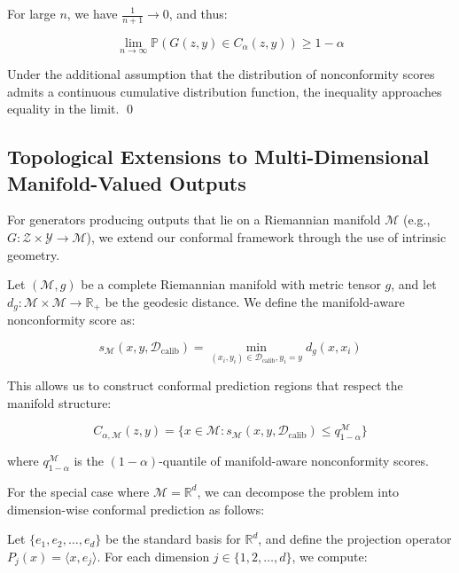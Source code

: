 \documentclass{article}
\theoremstyle{plain}
\theoremstyle{definition}
\theoremstyle{remark}
\begin{document}
For large $n$, we have $\frac{1}{n+1} \rightarrow 0$, and thus:

\begin{equation}
\lim_{n \rightarrow \infty} \mathbb{P}(G(z, y) \in C_{\alpha}(z, y)) \geq 1 - \alpha
\end{equation}

Under the additional assumption that the distribution of nonconformity scores admits a continuous cumulative distribution function, the inequality approaches equality in the limit. \qed

\subsection{Topological Extensions to Multi-Dimensional Manifold-Valued Outputs}

For generators producing outputs that lie on a Riemannian manifold $\mathcal{M}$ (e.g., $G: \mathcal{Z} \times \mathcal{Y} \rightarrow \mathcal{M}$), we extend our conformal framework through the use of intrinsic geometry.

Let $(\mathcal{M}, g)$ be a complete Riemannian manifold with metric tensor $g$, and let $d_g: \mathcal{M} \times \mathcal{M} \rightarrow \mathbb{R}_+$ be the geodesic distance. We define the manifold-aware nonconformity score as:

\begin{equation}
s_{\mathcal{M}}(x, y, \mathcal{D}_{\text{calib}}) = \min_{(x_i, y_i) \in \mathcal{D}_{\text{calib}}, y_i = y} d_g(x, x_i)
\end{equation}

This allows us to construct conformal prediction regions that respect the manifold structure:

\begin{equation}
C_{\alpha, \mathcal{M}}(z, y) = \{x \in \mathcal{M}: s_{\mathcal{M}}(x, y, \mathcal{D}_{\text{calib}}) \leq q_{1-\alpha}^{\mathcal{M}}\}
\end{equation}

where $q_{1-\alpha}^{\mathcal{M}}$ is the $(1-\alpha)$-quantile of manifold-aware nonconformity scores.

For the special case where $\mathcal{M} = \mathbb{R}^d$, we can decompose the problem into dimension-wise conformal prediction as follows:

Let $\{e_1, e_2, \ldots, e_d\}$ be the standard basis for $\mathbb{R}^d$, and define the projection operator $P_j(x) = \langle x, e_j \rangle$. For each dimension $j \in \{1, 2, \ldots, d\}$, we compute:
\end{document}
